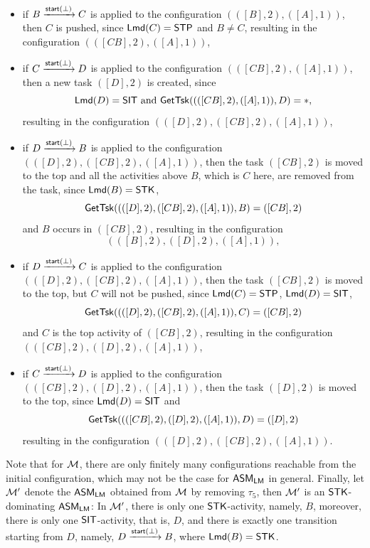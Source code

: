 \begin{example}
\begin{itemize}
			\item if $B \xrightarrow{{\mathsf{start} }(\bot)} C$ is applied to the configuration $(([B],2),([A],1))$, then $C$ is pushed, since ${\sf Lmd}(C) = \mathsf{STP}$ and $B\neq C$, resulting in the configuration $(([CB],2),([A],1))$,
			\item if $C \xrightarrow{{\mathsf{start} }(\bot)} D$ is applied to the configuration $(([CB],2),([A],1))$, then a new task $([D], 2)$ is created, since 
			$${\sf Lmd}(D) = \mathsf{SIT} \mbox{ and } \mathsf{GetTsk}((([CB],2),([A],1)), D) = *,$$ 
			resulting in the configuration $(([D],2),([CB],2),([A],1))$,
			\item if $D \xrightarrow{{\mathsf{start} }(\bot)} B$ is applied to the configuration $(([D],2),([CB],2),([A],1))$, then the task $([CB],2)$ is moved to the top and all the activities above $B$, which is $C$ here, are removed from the task, since ${\sf Lmd}(B) = \mathsf{STK}$, 
			$$\mathsf{GetTsk}((([D],2),([CB],2),([A],1)), B) = ([CB],2)$$
			and $B$ occurs in $([CB], 2)$, resulting in the configuration 
			$$(([B],2),([D],2),([A],1)),$$
			\item if $D \xrightarrow{{\mathsf{start} }(\bot)} C$ is applied to the configuration $(([D],2),([CB],2),([A],1))$, then the task $([CB],2)$ is moved to the top, but $C$ will not be pushed, since ${\sf Lmd}(C) = \mathsf{STP}$, ${\sf Lmd}(D) = \mathsf{SIT}$,
			$$\mathsf{GetTsk}((([D],2),([CB],2),([A],1)), C) = ([CB],2)$$
			and $C$ is the top activity of $([CB], 2)$, resulting in the configuration $(([CB],2),([D],2),([A],1))$,
			\item if $C \xrightarrow{{\mathsf{start} }(\bot)} D$ is applied to the configuration $(([CB],2),([D],2),([A],1))$, then the task $([D],2)$ is moved to the top, since ${\sf Lmd}(D) = \mathsf{SIT}$ and
			$$\mathsf{GetTsk}((([CB],2),([D],2),([A],1)), D) = ([D],2)$$
			resulting in the configuration $(([D],2),([CB],2),([A],1))$.
		\end{itemize}
		Note that for ${\mathcal{M} }$, there are only finitely many configurations reachable from the initial configuration, which may not be the case for $\textsf{ASM}_\textsf{LM}$ in general.  
Finally, let ${\mathcal{M} }'$ denote the $\textsf{ASM}_\textsf{LM}$ obtained from ${\mathcal{M} }$ by removing $\tau_5$, then ${\mathcal{M} }'$ is an $\mathsf{STK}$-dominating $\textsf{ASM}_\textsf{LM}$: In ${\mathcal{M} }'$, there is only one $\mathsf{STK}$-activity, namely, $B$, moreover, there is only one $\mathsf{SIT}$-activity, that is, $D$, and there is exactly one transition starting from $D$, namely, $D \xrightarrow{{\mathsf{start} }(\bot)} B$, where ${\sf Lmd}(B)= {\sf STK}$. 
	\end{example}
